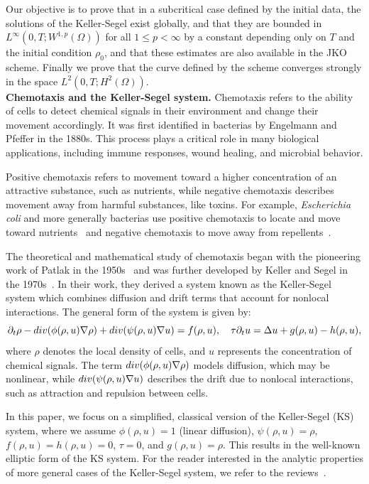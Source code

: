 \documentclass[a4paper,twosided, 11pt]{article}
\renewcommand{\color}[2][]{}
\newcommand {\Div}  { {\rm div} }
\newcommand {\p}   {\partial}
\theoremstyle{plain}
\theoremstyle{remark}
\numberwithin{equation}{section}
\begin{document}
Our objective is to prove that {\color{blue}in a subcritical case defined by the initial data, the solutions of the Keller-Segel exist globally}, and that they are bounded in $L^{\infty}(0,T; W^{1,p}(\Omega))$ for all $1 \leq p < \infty$ by a constant depending only on $T$ and the initial condition $\rho_{0}$, and that these estimates are also available in the JKO scheme. Finally we prove that the curve defined by the scheme converges strongly in the space $L^2(0,T; H^{2}(\Omega))$. \\

\textbf{Chemotaxis and the Keller-Segel system.}  Chemotaxis refers to the ability of cells to detect chemical signals in their environment and change their movement accordingly. It was first identified in bacterias by Engelmann and Pfeffer in the 1880s. This process plays a critical role in many biological applications, including immune responses, wound healing, and microbial behavior.

Positive chemotaxis refers to movement toward a higher concentration of an attractive substance, such as nutrients, while negative chemotaxis describes movement away from harmful substances, like toxins. For example, \textit{Escherichia coli} and more generally bacterias use positive chemotaxis to locate and move toward nutrients~\cite{adler} and negative chemotaxis to move away from repellents~\cite{wai-adler}. 

The theoretical and mathematical study of chemotaxis began with the pioneering work of Patlak in the 1950s~\cite{patlak1953random} and was further developed by Keller and Segel in the 1970s~\cite{keller_initiation_1970,KELLER1971225}. In their work, they derived a system known as the Keller-Segel system which combines diffusion and drift terms that account for nonlocal interactions. The general form of the system is given by:
$$
\p_t \rho - \Div(\phi(\rho,u)\nabla \rho) +\Div( \psi(\rho,u)\nabla u) = f(\rho,u),\quad \tau\p_t u = \Delta u + g(\rho,u) - h(\rho,u), 
$$
where $\rho$ denotes the local density of cells, and $u$ represents the concentration of chemical signals. The term $\Div(\phi(\rho,u)\nabla \rho)$ models diffusion, which may be nonlinear, while $\Div(\psi(\rho,u)\nabla u)$ describes the drift due to nonlocal interactions, such as attraction and repulsion between cells. 

In this paper, we focus on a simplified, classical version of the Keller-Segel (KS) system, where we assume $\phi(\rho,u) = 1$ (linear diffusion), $\psi(\rho,u) = \rho$, $f(\rho,u) = h(\rho,u) = 0$, $\tau = 0$, and $g(\rho,u) = \rho$. This results in the well-known elliptic form of the KS system. For the reader interested in the analytic properties of more general cases of the Keller-Segel system, we refer to the reviews~\cite{Arumugam2020KellerSegelCM, doi:10.1142/S021820251550044X,hillen2009user,horstmann2004keller}.
\end{document}
